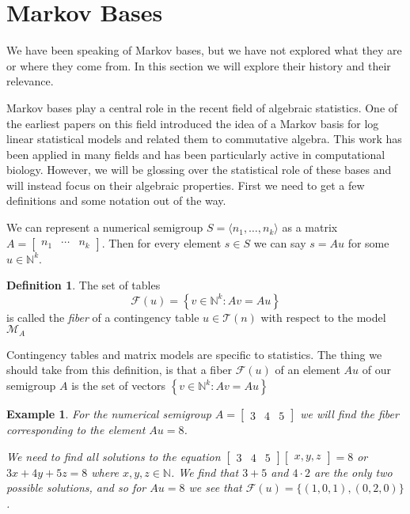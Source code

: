 \documentclass[11pt]{amsart}
\theoremstyle{plain}
\newtheorem{exa}{Example}
\theoremstyle{definition}
\newtheorem{defi}{Definition}
\begin{document}
\section{Markov Bases}
We have been speaking of Markov bases, but we have not explored what they are or
where they come from. In this section we will explore their history and their
relevance.

Markov bases play a central role in the recent field of algebraic statistics.
One of the earliest papers on this field\cite{bernd} introduced the idea of a
Markov basis for log linear statistical models\cite{markstats} and related them
to commutative algebra. This work has been applied in many fields and has been
particularly active in computational biology. However, we will be glossing over
the statistical role of these bases and will instead focus on their algebraic
properties. First we need to get a few definitions and some notation out of the
way.

We can represent a numerical semigroup $S=\langle n_1,\dots,n_k \rangle$ as a
matrix $A=\left[\begin{array}{rrr}n_1&\cdots&n_k\end{array}\right]$. Then for
every element $s\in S$ we can say $s=Au$ for some $u\in \mathbb{N}^k$.

\begin{defi}
  \cite{bernd}
  The set of tables
  \[\mathcal{F}(u)=\left\{v\in \mathbb{N}^k:Av=Au\right\}\]
  is called the \emph{fiber} of a contingency table $u\in \mathcal{T}(n)$ with
  respect to the model $\mathcal{M}_A$
\end{defi}

Contingency tables and matrix models are specific to statistics. The thing we
should take from this definition, is that a fiber $\mathcal{F}(u)$ of an element
$Au$ of our semigroup $A$ is the set of vectors $\left\{v\in \mathbb{N}^k:Av=Au
\right\}$
\begin{exa}
  For the numerical semigroup $A=\left[\begin{array}{rrr}3&4&5\end{array}\right]$
  we will find the fiber corresponding to the element $Au=8$.

  We need to find all solutions to the equation $\left[\begin{array}{rrr}3&4&5
\end{array}\right]\left[\begin{array}{rrr}x,y,z \end{array}\right]=8$ or
$3x+4y+5z=8$ where $x,y,z\in \mathbb{N}$. We find that $3+5$ and $4\cdot 2$ are
the only two possible solutions, and so for $Au=8$ we see that $\mathcal{F}(u)=
\{(1,0,1),(0,2,0)\}$.
\end{exa}
\end{document}
